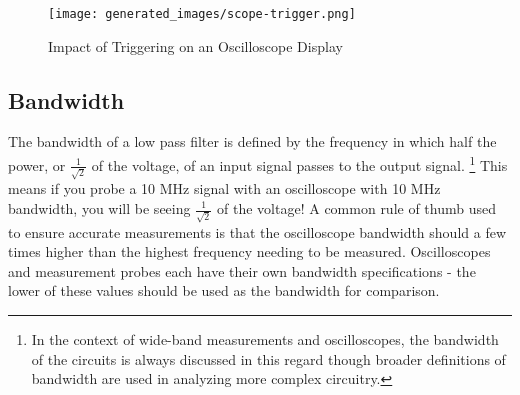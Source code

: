 \documentclass[main.tex]{subfiles}
\begin{document}
\begin{figure}[H]
    \centering
    \texttt{[image: generated\_images/scope-trigger.png]}
    \caption{Impact of Triggering on an Oscilloscope Display}
    \label{fig:scope-triggering}
\end{figure}

\subsection{Bandwidth}
The bandwidth of a low pass filter is defined by the frequency in which half the power, or $\frac{1}{\sqrt{2}}$ of the voltage, of an input signal passes to the output signal. \footnote{In the context of wide-band measurements and oscilloscopes, the bandwidth of the circuits is always discussed in this regard though broader definitions of bandwidth are used in analyzing more complex circuitry.}
This means if you probe a 10 MHz signal with an oscilloscope with 10 MHz bandwidth, you will be seeing $\frac{1}{\sqrt{2}}$ of the voltage! A common rule of thumb used to ensure accurate measurements is that the oscilloscope bandwidth should a few times higher than the highest frequency needing to be measured. Oscilloscopes and measurement probes each have their own bandwidth specifications - the lower of these values should be used as the bandwidth for comparison. \newline


\end{document}
